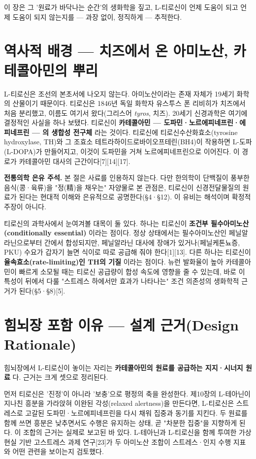 \documentclass[12pt,oneside]{book}
\newenvironment{authnote}
  {\par\smallskip\begingroup\leftskip=6mm\rightskip=3mm\small\color{muted}\noindent\ignorespaces}
  {\par\endgroup\smallskip}
\begin{document}
이 장은 그 '원료가 바닥나는 순간'의 생화학을 짚고, L-티로신이 언제 도움이 되고 언제 도움이 되지 않는지를 — 과장 없이, 정직하게 — 추적한다.

\section{역사적 배경 — 치즈에서 온 아미노산, 카테콜아민의 뿌리}

L-티로신은 조선의 본초서에 나오지 않는다. 아미노산이라는 존재 자체가 19세기 화학의 산물이기 때문이다. 티로신은 1846년 독일 화학자 유스투스 폰 리비히가 치즈에서 처음 분리했고, 이름도 여기서 왔다(그리스어 \textit{tyros}, 치즈). 20세기 신경과학은 여기에 결정적인 사실을 하나 보탰다. 티로신이 \textbf{카테콜아민 — 도파민·노르에피네프린·에피네프린 — 의 생합성 전구체} 라는 것이다. 티로신에 티로신수산화효소(tyrosine hydroxylase, TH)와 그 조효소 테트라하이드로바이오프테린(BH4)이 작용하면 L-도파(L-DOPA)가 만들어지고, 이것이 도파민을 거쳐 노르에피네프린으로 이어진다. 이 경로가 카테콜아민 대사의 근간이다[7][14][17].

\begin{authnote}\textbf{전통의학 은유 주석.} 본 절은 사료를 인용하지 않는다. 다만 한의학이 단백질이 풍부한 음식(콩·육류)을 "정(精)을 채우는" 자양물로 본 관점은, 티로신이 신경전달물질의 원료가 된다는 현대적 이해와 은유적으로 공명한다(§4·§12). 이 유비는 해석이며 확정적 주장이 아니다.\end{authnote}

티로신의 과학사에서 눈여겨볼 대목이 둘 있다. 하나는 티로신이 \textbf{조건부 필수아미노산(conditionally essential)} 이라는 점이다. 정상 상태에서는 필수아미노산인 페닐알라닌으로부터 간에서 합성되지만, 페닐알라닌 대사에 장애가 있거나(페닐케톤뇨증, PKU) 수요가 갑자기 늘면 식이로 따로 공급해 줘야 한다[1][13]. 다른 하나는 티로신이 \textbf{율속효소(rate-limiting)인 TH의 기질} 이라는 점이다. 뉴런 발화율이 높아 카테콜아민이 빠르게 소모될 때는 티로신 공급량이 합성 속도에 영향을 줄 수 있는데, 바로 이 특성이 뒤에서 다룰 "스트레스 하에서만 효과가 나타나는" 조건 의존성의 생화학적 근거가 된다(§5·§8)[5].

\section{힘뇌장 포함 이유 — 설계 근거(Design Rationale)}

힘뇌장에서 L-티로신이 놓이는 자리는 \textbf{카테콜아민의 원료를 공급하는 지지·시너지 원료} 다. 근거는 크게 셋으로 정리된다.

먼저 티로신은 '진정'이 아니라 '보충'으로 평정의 축을 완성한다. 제10장의 L-테아닌이 지나친 흥분을 가라앉혀 이완된 각성(relaxed alertness)을 만든다면, L-티로신은 스트레스로 고갈된 도파민·노르에피네프린을 다시 채워 집중과 동기를 지킨다. 두 원료를 함께 쓰면 흥분은 낮추면서도 수행은 유지하는 상태, 곧 "차분한 집중"을 지향하게 된다. 이 조합의 근거는 실제로 보고된 바 있다. L-테아닌과 L-티로신을 함께 투여한 가상현실 기반 고스트레스 과제 연구[23]가 두 아미노산 조합이 스트레스·인지 수행 지표와 어떤 관련을 보이는지 검토했다.
\end{document}

